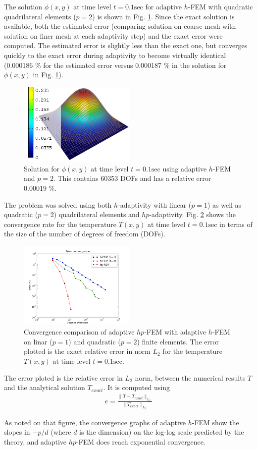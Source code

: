 The solution $\phi(x,y)$ at time level $t=0.1 \mbox{sec}$ for adaptive $h$-FEM with quadratic quadrilateral elements ($p=2$) is shown in Fig. \ref{sol_temp}.  Since the exact solution is available, both the estimated error (comparing solution on coarse mesh with solution on finer mesh at each adaptivity step) and the exact error were computed.  The estimated error is slightly less than the exact one, but converges quickly to the exact error during adaptivity to become virtually identical (0.000186 \% for the estimated error versus 0.000187 \% in the solution for $\phi(x,y)$ in Fig. \ref{sol_temp}).
\begin{figure}
  \includegraphics[width=0.5\textwidth]{figures/solution_T}
  \caption{Solution for $\phi(x,y)$ at time level $t=0.1 \mbox{sec}$ using adaptive $h$-FEM and $p=2$.  This contains 60353 DOFs and has a relative error 0.00019 \%.}
  \label{sol_temp}
\end{figure}

The problem was solved using both $h$-adaptivity with linear ($p=1$) as well as quadratic ($p=2$) quadrilateral elements and $hp$-adaptivity.  Fig. \ref{err_conv} shows the convergence rate for the temperature $T(x,y)$ at time level $t=0.1 \mbox{sec}$ in terms of the size of the number of degrees of freedom (DOFs).
\begin{figure}
  \includegraphics[width=0.5\textwidth]{figures/exact_err_conv}
  \caption{Convergence comparison of adaptive $hp$-FEM with adaptive $h$-FEM on linar ($p=1$) and quadratic ($p=2$) finite elements.  The error plotted is the exact relative error in norm $L_2$ for the temperature $T(x,y)$ at time level $t=0.1 \mbox{sec}$.}
  \label{err_conv}
\end{figure}

The error ploted is the relative error in $L_2$ norm, between the numerical results $T$ and the analytical solution $T_{exact}$.  It is computed using
\begin{align}
  e = \frac{ \|T-T_{exact}\|_{L_2} }{ \|T_{exact}\|_{L_2} }
\end{align}

As noted on that figure, the convergence graphs of adaptive $h$-FEM show the slopes in $-p/d$ (where $d$ is the dimension) on the log-log scale predicted by the theory, and adaptive $hp$-FEM does reach exponential convergence.
